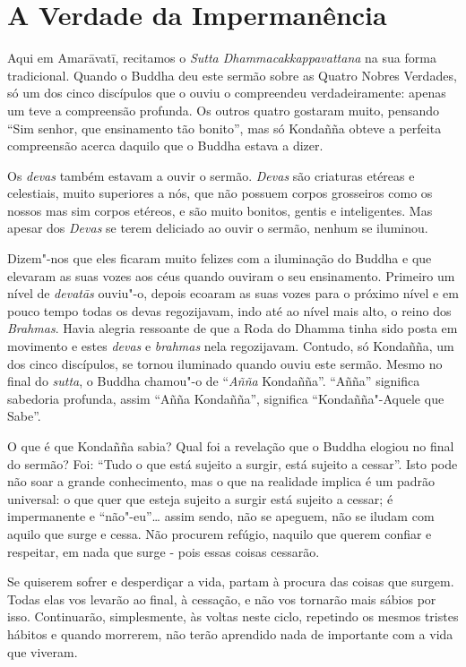 \section{A Verdade da Impermanência}

Aqui em Amarāvatī, recitamos o \emph{Sutta Dhammacakkappavattana} na sua forma
tradicional. Quando o Buddha deu este sermão sobre as Quatro Nobres Verdades, só
um dos cinco discípulos que o ouviu o compreendeu verdadeiramente: apenas um
teve a compreensão profunda. Os outros quatro gostaram muito, pensando “Sim
senhor, que ensinamento tão bonito”, mas só Kondañña obteve a perfeita
compreensão acerca daquilo que o Buddha estava a dizer.

Os \emph{devas} também estavam a ouvir o sermão. \emph{Devas} são criaturas
etéreas e celestiais, muito superiores a nós, que não possuem corpos grosseiros
como os nossos mas sim corpos etéreos, e são muito bonitos, gentis e
inteligentes. Mas apesar dos \emph{Devas} se terem deliciado ao ouvir o sermão,
nenhum se iluminou.

Dizem"-nos que eles ficaram muito felizes com a iluminação do Buddha e que
elevaram as suas vozes aos céus quando ouviram o seu ensinamento. Primeiro um nível 
de \emph{devatās} ouviu"-o, depois ecoaram as suas vozes para o próximo nível e 
em pouco tempo todas os devas regozijavam, indo até ao nível mais alto, o reino dos
\emph{Brahmas}. Havia alegria ressoante de que a Roda do Dhamma tinha sido posta
em movimento e estes \emph{devas} e \emph{brahmas} nela regozijavam. Contudo, só
Kondañña, um dos cinco discípulos, se tornou iluminado quando ouviu este sermão.
Mesmo no final do \emph{sutta}, o Buddha chamou"-o de “\emph{Añña} Kondañña”.
“Añña” significa sabedoria profunda, assim “Añña Kondañña”, significa
“Kondañña"-Aquele que Sabe”.

O que é que Kondañña sabia? Qual foi a revelação que o Buddha elogiou no final
do sermão? Foi: “Tudo o que está sujeito a surgir, está sujeito a cessar”. Isto
pode não soar a grande conhecimento, mas o que na realidade implica é um padrão
universal: o que quer que esteja sujeito a surgir está sujeito a cessar; é
impermanente e “não"-eu”\ldots{} assim sendo, não se apeguem, não se iludam com
aquilo que surge e cessa. Não procurem refúgio, naquilo que querem confiar e
respeitar, em nada que surge - pois essas coisas cessarão.

Se quiserem sofrer e desperdiçar a vida, partam à procura das coisas que surgem.
Todas elas vos levarão ao final, à cessação, e não vos tornarão mais sábios por
isso. Continuarão, simplesmente, às voltas neste ciclo, repetindo os mesmos
tristes hábitos e quando morrerem, não terão aprendido nada de importante com a
vida que viveram.

